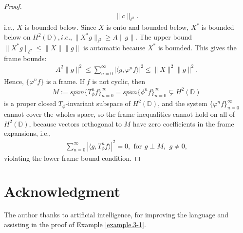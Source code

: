 \documentclass[12pt,titlepage]{amsart}
\theoremstyle{definition}
\theoremstyle{remark}
\begin{document}
\begin{proof}
\begin{eqnarray*}
\|c\|_{\ell^2}.
\end{eqnarray*}
i.e., $X$ is bounded below. Since $X$ is onto and bounded below,
$X^*$ is bounded below on $H^2(\mathbb{D}), i.e., \|X^*
g\|_{\ell^2} \geq A \|g\|$. The upper bound $\|X^* g\|_{\ell^2}
\leq \|X\| \|g\|$ is automatic because $X^*$ is bounded. This
gives the frame bounds:
\begin{eqnarray*}
A^2 \|g\|^2 \leq \sum_{n=0}^\infty |\langle g, \varphi^n f
\rangle|^2 \leq \|X\|^2 \|g\|^2.
\end{eqnarray*}
Hence, $\{ \varphi^n f \}$ is a frame. If $f$ is not cyclic, then
\begin{eqnarray*}
M:=\overline{span}\{T^n_{\phi}f\}_{n=0}^{\infty}=\overline{span}\{\phi^nf\}_{n=0}^{\infty}\varsubsetneq
H^2(\mathbb{D})
\end{eqnarray*}
is a proper closed $T_{\phi}$-invariant subspace of
$H^2(\mathbb{D})$, and the system $\{ \varphi^n f
\}_{n=0}^{\infty}$ cannot cover the wholes space, so the frame
inequalities cannot hold on all of $H^2(\mathbb{D})$, because
vectors orthogonal to $M$ have zero coefficients in the frame
expansions, i.e.,
\begin{eqnarray*}
\sum_{n=0}^{\infty}|\langle g, T^n_{\phi}f \rangle|^2=0, \,\
\mbox{for}\,\ g\perp M,\,\ g\neq 0,
\end{eqnarray*}
violating the lower frame bound condition.
\end{proof}
\bigskip


\section{Acknowledgment}
The author thanks to artificial intelligence, for improving the
language and assisting in the proof of Example \ref{example.3-1}.
\noindent

\end{document}
